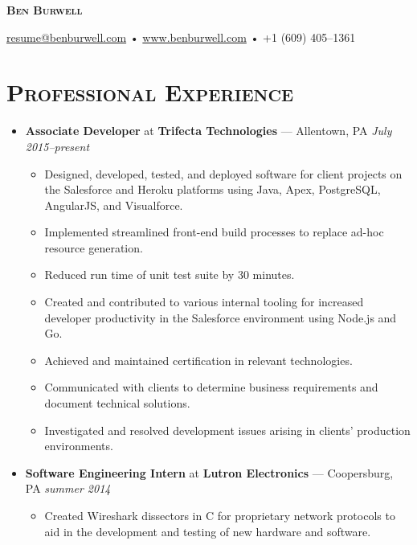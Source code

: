 \documentclass[11pt]{article}
\begin{document}
\thispagestyle{empty}

\begin{center}
  {\LARGE\textsc{\textbf{Ben Burwell}}}
\end{center}
\begin{center}
  \href{mailto:resume@benburwell.com}{resume@benburwell.com} • \href{https://www.benburwell.com/}{www.benburwell.com} • +1 (609) 405--1361 \\
  \hrulefill
\end{center}



\section*{\textsc{Professional Experience}}
\begin{itemize}
  \item \textbf{Associate Developer} at \textbf{Trifecta Technologies} --- Allentown, PA \hfill {\em July 2015--present}
    \begin{itemize}
      \item Designed, developed, tested, and deployed software for client projects on the Salesforce and Heroku platforms using Java, Apex, PostgreSQL, AngularJS, and Visualforce.
      \item Implemented streamlined front-end build processes to replace ad-hoc resource generation.
      \item Reduced run time of unit test suite by 30 minutes.
      \item Created and contributed to various internal tooling for increased developer productivity in the Salesforce environment using Node.js and Go.
      \item Achieved and maintained certification in relevant technologies.
      \item Communicated with clients to determine business requirements and document technical solutions.
      \item Investigated and resolved development issues arising in clients' production environments.
    \end{itemize}
  \item \textbf{Software Engineering Intern} at \textbf{Lutron Electronics} --- Coopersburg, PA \hfill {\em summer 2014}
    \begin{itemize}
      \item Created Wireshark dissectors in C for proprietary network protocols to aid in the development and testing of new hardware and software.

\end{itemize}
\end{itemize}
\end{document}
